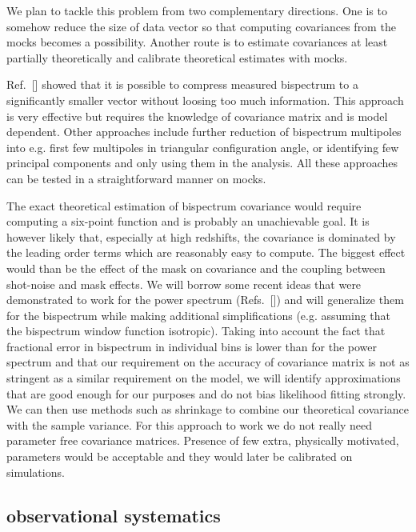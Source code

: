 We plan to tackle this problem from two complementary directions. One is to
somehow reduce the size of data vector so that computing covariances from the
mocks becomes a possibility. Another route is to estimate covariances at least
partially theoretically and calibrate theoretical estimates with mocks. 

Ref.~[] showed that it is possible to compress measured bispectrum to a
significantly smaller vector without loosing too much information. This
approach is very effective but requires the knowledge of covariance matrix and
is model dependent. Other approaches include further reduction of bispectrum
multipoles into e.g. first few multipoles in triangular configuration angle, or
identifying few principal components and only using them in the analysis. All
these approaches can be tested in a straightforward manner on mocks.

The exact theoretical estimation of bispectrum covariance would require
computing a six-point function and is probably an unachievable goal. It is
however likely that, especially at high redshifts, the covariance is dominated
by the leading order terms which are reasonably easy to compute. The biggest
effect would than be the effect of the mask on covariance and the coupling
between shot-noise and mask effects. We will borrow some recent ideas that were
demonstrated to work for the power spectrum (Refs.~[]) and will generalize them
for the bispectrum while making additional simplifications (e.g. assuming that
the bispectrum window function isotropic). Taking into account the fact that
fractional error in bispectrum in individual bins is lower than for the power
spectrum and that our requirement on the accuracy of covariance matrix is not
as stringent as a similar requirement on the model, we will identify
approximations that are good enough for our purposes and do not bias likelihood
fitting strongly. We can then use methods such as shrinkage to combine our
theoretical covariance with the sample variance. For this approach to work we
do not really need parameter free covariance matrices. Presence of few extra,
physically motivated, parameters would be acceptable and they would later be
calibrated on simulations.

\subsection*{observational systematics}


